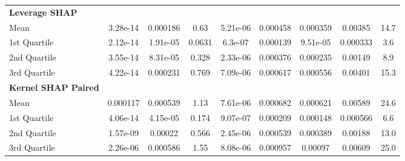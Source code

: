 {\begin{tabular} {lcccccccc}
\addlinespace[1ex] 
\textbf{Leverage SHAP} &  &  &  &  &  &  &  &  \\ 
\hspace{7pt}Mean & \cellcolor{bronze!60}3.28e-14 & \cellcolor{gold!60}0.000186 & \cellcolor{gold!60}0.63 & \cellcolor{gold!60}5.21e-06 & \cellcolor{gold!60}0.000458 & \cellcolor{gold!60}0.000359 & \cellcolor{gold!60}0.00385 & \cellcolor{gold!60}14.7 \\ 
\hspace{7pt}1st Quartile & \cellcolor{gold!60}2.12e-14 & \cellcolor{gold!60}1.91e-05 & \cellcolor{gold!60}0.0631 & \cellcolor{gold!60}6.3e-07 & \cellcolor{gold!60}0.000139 & \cellcolor{gold!60}9.51e-05 & \cellcolor{gold!60}0.000333 & \cellcolor{gold!60}3.6 \\ 
\hspace{7pt}2nd Quartile & \cellcolor{bronze!60}3.55e-14 & \cellcolor{gold!60}8.31e-05 & \cellcolor{gold!60}0.328 & \cellcolor{gold!60}2.33e-06 & \cellcolor{gold!60}0.000376 & \cellcolor{gold!60}0.000235 & \cellcolor{gold!60}0.00149 & \cellcolor{gold!60}8.9 \\ 
\hspace{7pt}3rd Quartile & \cellcolor{bronze!60}4.22e-14 & \cellcolor{gold!60}0.000231 & \cellcolor{gold!60}0.769 & \cellcolor{gold!60}7.09e-06 & \cellcolor{gold!60}0.000617 & \cellcolor{gold!60}0.000556 & \cellcolor{gold!60}0.00401 & \cellcolor{gold!60}15.3 \\ 
\addlinespace[1ex] 
\textbf{Kernel SHAP Paired} &  &  &  &  &  &  &  &  \\ 
\hspace{7pt}Mean & 0.000117 & \cellcolor{silver!60}0.000539 & \cellcolor{silver!60}1.13 & \cellcolor{silver!60}7.61e-06 & \cellcolor{silver!60}0.000682 & \cellcolor{silver!60}0.000621 & \cellcolor{bronze!60}0.00589 & \cellcolor{bronze!60}24.6 \\ 
\hspace{7pt}1st Quartile & 4.06e-14 & \cellcolor{silver!60}4.15e-05 & \cellcolor{silver!60}0.174 & \cellcolor{silver!60}9.07e-07 & \cellcolor{silver!60}0.000209 & \cellcolor{silver!60}0.000148 & \cellcolor{silver!60}0.000566 & \cellcolor{bronze!60}6.6 \\ 
\hspace{7pt}2nd Quartile & 1.57e-09 & \cellcolor{silver!60}0.00022 & \cellcolor{silver!60}0.566 & \cellcolor{silver!60}2.45e-06 & \cellcolor{silver!60}0.000539 & \cellcolor{bronze!60}0.000389 & \cellcolor{silver!60}0.00188 & \cellcolor{bronze!60}13.0 \\ 
\hspace{7pt}3rd Quartile & 2.26e-06 & \cellcolor{silver!60}0.000586 & \cellcolor{silver!60}1.55 & \cellcolor{silver!60}8.08e-06 & \cellcolor{silver!60}0.000957 & \cellcolor{bronze!60}0.00097 & \cellcolor{silver!60}0.00609 & \cellcolor{silver!60}25.0 \\ 

\end{tabular}}
